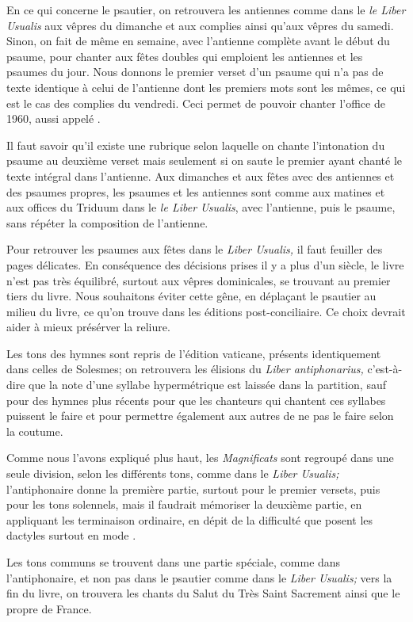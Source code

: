 \begin{frpars}
En ce qui concerne le psautier, on retrouvera les antiennes comme dans le \textit{le Liber Usualis} aux vêpres du dimanche et aux complies ainsi qu'aux vêpres du samedi. Sinon, on fait de même en semaine, avec l'antienne complète avant le début du psaume, pour chanter aux fêtes doubles qui emploient les antiennes et les psaumes du jour. Nous donnons le premier verset d'un psaume qui n'a pas de texte identique à celui de l'antienne dont les premiers mots sont les mêmes, ce qui est le cas des complies du vendredi. Ceci permet de pouvoir chanter l'office de 1960, aussi appelé . 

Il faut savoir qu'il existe une rubrique selon laquelle on chante l'intonation du psaume au deuxième verset mais seulement si on saute le premier ayant chanté le texte intégral dans l'antienne. Aux dimanches et aux fêtes avec des antiennes et des psaumes propres, les psaumes et les antiennes sont comme aux matines et aux offices du Triduum dans le \textit{le Liber Usualis}, avec l'antienne, puis le psaume, sans répéter la composition de l'antienne.

Pour retrouver les psaumes aux fêtes dans le \textit{Liber Usualis,} il faut feuiller des pages délicates. En conséquence des décisions prises il y a plus d'un siècle, le livre n'est pas très équilibré, surtout aux vêpres dominicales, se trouvant au premier tiers du livre. Nous souhaitons éviter cette gêne, en déplaçant le psautier au milieu du livre, ce qu'on trouve dans les éditions post-conciliaire. Ce choix devrait aider à mieux présérver la reliure.

Les tons des hymnes sont repris de l'édition vaticane, présents identiquement dans celles de Solesmes; on retrouvera les élisions du \textit{Liber antiphonarius,} c’est-à-dire que la note d'une syllabe hypermétrique est laissée dans la partition, sauf pour des hymnes plus récents pour que les chanteurs qui chantent ces syllabes puissent le faire et pour permettre également aux autres de ne pas le faire selon la coutume. 

Comme nous l'avons expliqué plus haut, les \textit{Magnificats} sont regroupé dans une seule division, selon les différents tons, comme dans le \textit{Liber Usualis;} l'antiphonaire donne la première partie, surtout pour le premier versets, puis pour les tons solennels, mais il faudrait mémoriser la deuxième partie, en appliquant les terminaison ordinaire, en dépit de la difficulté que posent les dactyles surtout en mode .

Les tons communs se trouvent dans une partie spéciale, comme dans l'antiphonaire, et non pas dans le psautier comme dans  le \textit{Liber Usualis;} vers la fin du livre, on trouvera les chants du Salut du Très Saint Sacrement ainsi que le propre de France.


\end{frpars}
